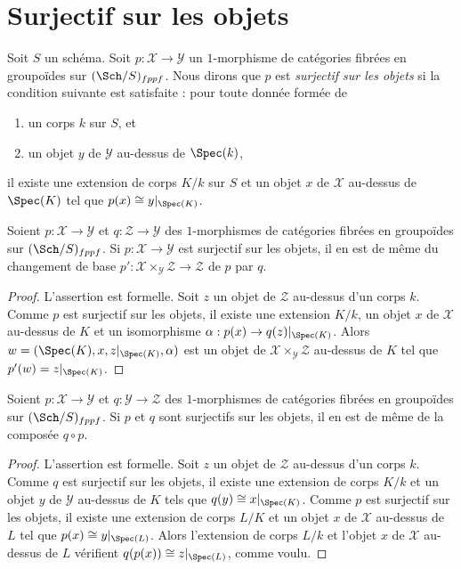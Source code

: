 \section{Surjectif sur les objets}
\label{section-formally-surjective}

\noindent
Soit $S$ un schéma. Soit $p : \mathcal{X} \to \mathcal{Y}$ un $1$-morphisme
de catégories fibrées en groupoïdes sur $(\Sch/S)_{fppf}$. Nous dirons que
$p$ est {\it surjectif sur les objets} si la condition suivante est satisfaite :
pour toute donnée formée de
\begin{enumerate}
\item un corps $k$ sur $S$, et
\item un objet $y$ de $\mathcal{Y}$ au-dessus de $\Spec(k)$,
\end{enumerate}
il existe une extension de corps $K/k$ sur $S$ et un
objet $x$ de $\mathcal{X}$ au-dessus de $\Spec(K)$
tel que $p(x) \cong y|_{\Spec(K)}$.

\begin{lemma}
\label{lemma-base-change-surjective}
Soient $p : \mathcal{X} \to \mathcal{Y}$ et $q : \mathcal{Z} \to \mathcal{Y}$
des $1$-morphismes de catégories fibrées en groupoïdes sur $(\Sch/S)_{fppf}$.
Si $p : \mathcal{X} \to \mathcal{Y}$ est surjectif sur les objets, il en
est de même du changement de base
$p' : \mathcal{X} \times_\mathcal{Y} \mathcal{Z} \to \mathcal{Z}$
de $p$ par $q$.
\end{lemma}

\begin{proof}
L'assertion est formelle. Soit $z$ un objet de $\mathcal{Z}$ au-dessus d'un corps $k$.
Comme $p$ est surjectif sur les objets, il existe une extension $K/k$,
un objet $x$ de $\mathcal{X}$ au-dessus de $K$ et un isomorphisme
$\alpha : p(x) \to q(z)|_{\Spec(K)}$. Alors
$w = (\Spec(K), x, z|_{\Spec(K)}, \alpha)$ est un objet de
$\mathcal{X} \times_\mathcal{Y} \mathcal{Z}$ au-dessus de $K$ tel que
$p'(w) = z|_{\Spec(K)}$.
\end{proof}

\begin{lemma}
\label{lemma-composition-surjective}
Soient $p : \mathcal{X} \to \mathcal{Y}$ et $q : \mathcal{Y} \to \mathcal{Z}$
des $1$-morphismes de catégories fibrées en groupoïdes sur $(\Sch/S)_{fppf}$.
Si $p$ et $q$ sont surjectifs sur les objets, il en est de même de la composée
$q \circ p$.
\end{lemma}

\begin{proof}
L'assertion est formelle. Soit $z$ un objet de $\mathcal{Z}$ au-dessus d'un corps $k$.
Comme $q$ est surjectif sur les objets, il existe une extension de corps $K/k$
et un objet $y$ de $\mathcal{Y}$ au-dessus de $K$ tels que
$q(y) \cong x|_{\Spec(K)}$. Comme $p$ est surjectif sur les objets, il
existe une extension de corps $L/K$ et un objet $x$ de $\mathcal{X}$
au-dessus de $L$ tel que $p(x) \cong y|_{\Spec(L)}$. Alors l'extension de corps
$L/k$ et l'objet $x$ de $\mathcal{X}$ au-dessus de $L$ vérifient
$q(p(x)) \cong z|_{\Spec(L)}$, comme voulu.
\end{proof}

